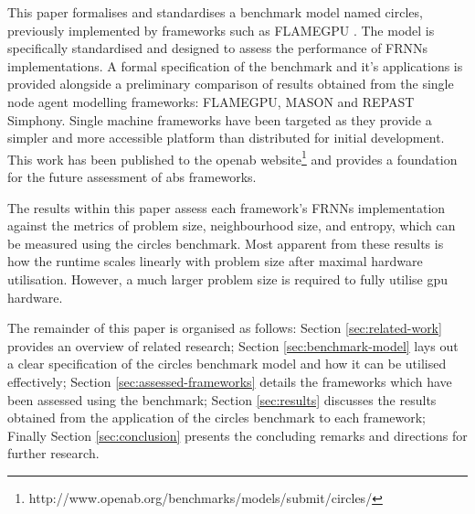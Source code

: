   This paper formalises and standardises a benchmark model named circles, previously implemented by frameworks such as FLAMEGPU \cite{RR082}. The model is specifically standardised and designed to assess the performance of FRNNs implementations. A formal specification of the benchmark and it's applications is provided alongside a preliminary comparison of results obtained from the single node agent modelling frameworks: FLAMEGPU, MASON and REPAST Simphony. Single machine frameworks have been targeted as they provide a simpler and more accessible platform than distributed for initial development. This work has been published to the \gls{openab} website\footnote{http://www.openab.org/benchmarks/models/submit/circles/} and provides a foundation for the future assessment of \gls{abs} frameworks.
  
  The results within this paper assess each framework’s FRNNs implementation against the metrics of problem size, neighbourhood size, and entropy, which can be measured using the circles benchmark. Most apparent from these results is how the runtime scales linearly with problem size after maximal hardware utilisation. However, a much larger problem size is required to fully utilise \gls{gpu} hardware.
  
  The remainder of this paper is organised as follows: Section \ref{sec:related-work} provides an overview of related research; Section \ref{sec:benchmark-model} lays out a clear specification of the circles benchmark model and how it can be utilised effectively; Section \ref{sec:assessed-frameworks} details the frameworks which have been assessed using the benchmark; Section \ref{sec:results} discusses the results obtained from the application of the circles benchmark to each framework; Finally Section \ref{sec:conclusion} presents the concluding remarks and directions for further research.